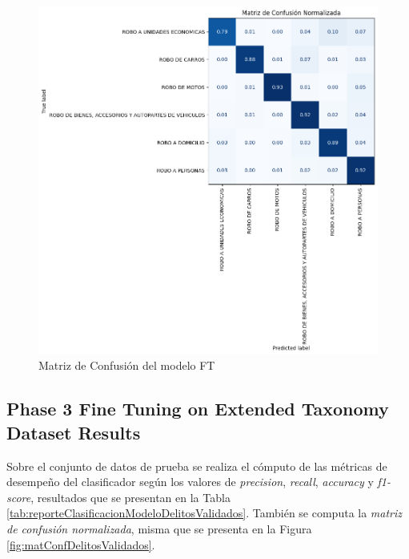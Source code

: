 \documentclass[onecolumn, journal, english, 12pt, a4paper]{IEEEtran} %
\theoremstyle{definition}
\begin{document}
\begin{figure}[!t]
    \centering
    \includegraphics[width=\textwidth]{imgs/FineTuning10_epochs.png}
    \caption{Matriz de Confusión del modelo FT}
    \label{fig:matconfusion}
  \end{figure}
  
\subsection{Phase 3 Fine Tuning on Extended Taxonomy Dataset Results}
\label{sec:phase-3-extended-dataset-results-ft}

Sobre el conjunto de datos de prueba se realiza el cómputo de las
métricas de desempeño del clasificador según los valores de
\emph{precision}, \emph{recall}, \emph{accuracy} y \emph{f1-score},
resultados que se presentan en la Tabla
\ref{tab:reporteClasificacionModeloDelitosValidados}. También se
computa la \emph{matriz de confusión normalizada}, misma que se
presenta en la Figura \ref{fig:matConfDelitosValidados}.
\end{document}
